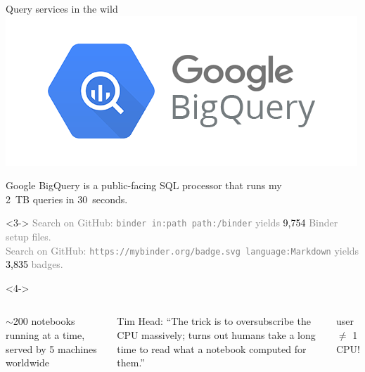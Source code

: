 \documentclass[aspectratio=169]{beamer}
\begin{document}
\begin{frame}{Query services in the wild}
\hfill \includegraphics[height=1.5 cm]{google-bigquery-logo.png}

\vspace{-1.25 cm}
Google BigQuery is a public-facing SQL processor that runs my \\ 2~TB queries in 30~seconds.

\vspace{0.5 cm}
\hfill {}

\vspace{-1.1 cm}

\vspace{0.25 cm}
\begin{uncoverenv}<3->
\textcolor{gray}{\small
Search on GitHub: {\tt\scriptsize binder in:path path:/binder} yields \textcolor{black}{9,754} Binder setup files. \\
Search on GitHub: {\tt\scriptsize https://mybinder.org/badge.svg language:Markdown} yields \textcolor{black}{3,835} badges.}
\end{uncoverenv}

\begin{uncoverenv}<4->
\begin{columns}
\small
$\sim$200 notebooks running at a time, served by 5 machines worldwide

\vspace{0.25 cm}
\scriptsize Tim Head: ``The trick is to oversubscribe the CPU massively; turns out humans take a long time to read what a notebook computed for them.''

\normalsize
\vspace{0.25 cm}
 user $\neq$ 1 CPU!


\end{columns}
\end{uncoverenv}
\end{frame}
\end{document}
